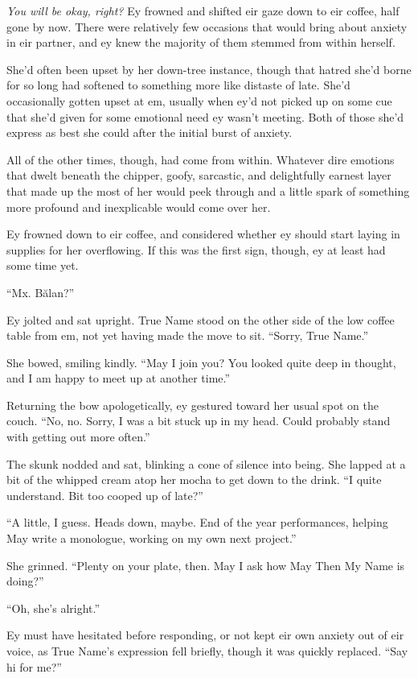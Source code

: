 \emph{You will be okay, right?} Ey frowned and shifted eir gaze down to eir coffee, half gone by now. There were relatively few occasions that would bring about anxiety in eir partner, and ey knew the majority of them stemmed from within herself.

She'd often been upset by her down-tree instance, though that hatred she'd borne for so long had softened to something more like distaste of late. She'd occasionally gotten upset at em, usually when ey'd not picked up on some cue that she'd given for some emotional need ey wasn't meeting. Both of those she'd express as best she could after the initial burst of anxiety.

All of the other times, though, had come from within. Whatever dire emotions that dwelt beneath the chipper, goofy, sarcastic, and delightfully earnest layer that made up the most of her would peek through and a little spark of something more profound and inexplicable would come over her.

Ey frowned down to eir coffee, and considered whether ey should start laying in supplies for her overflowing. If this was the first sign, though, ey at least had some time yet.

``Mx. Bălan?''

Ey jolted and sat upright. True Name stood on the other side of the low coffee table from em, not yet having made the move to sit. ``Sorry, True Name.''

She bowed, smiling kindly. ``May I join you? You looked quite deep in thought, and I am happy to meet up at another time.''

Returning the bow apologetically, ey gestured toward her usual spot on the couch. ``No, no. Sorry, I was a bit stuck up in my head. Could probably stand with getting out more often.''

The skunk nodded and sat, blinking a cone of silence into being. She lapped at a bit of the whipped cream atop her mocha to get down to the drink. ``I quite understand. Bit too cooped up of late?''

``A little, I guess. Heads down, maybe. End of the year performances, helping May write a monologue, working on my own next project.''

She grinned. ``Plenty on your plate, then. May I ask how May Then My Name is doing?''

``Oh, she's alright.''

Ey must have hesitated before responding, or not kept eir own anxiety out of eir voice, as True Name's expression fell briefly, though it was quickly replaced. ``Say hi for me?''

